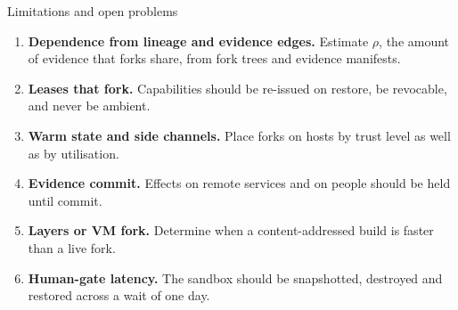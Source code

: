 \begin{frame}[t]{Limitations and open problems}
\begin{enumerate}
\item \textbf{Dependence from lineage and evidence edges.} Estimate $\rho$, the amount of evidence that forks share, from fork trees and evidence manifests.
\item \textbf{Leases that fork.} Capabilities should be re-issued on restore, be revocable, and never be ambient.
\item \textbf{Warm state and side channels.} Place forks on hosts by trust level as well as by utilisation.
\item \textbf{Evidence commit.} Effects on remote services and on people should be held until commit.
\item \textbf{Layers or VM fork.} Determine when a content-addressed build is faster than a live fork.
\item \textbf{Human-gate latency.} The sandbox should be snapshotted, destroyed and restored across a wait of one day.
\end{enumerate}
\end{frame}

